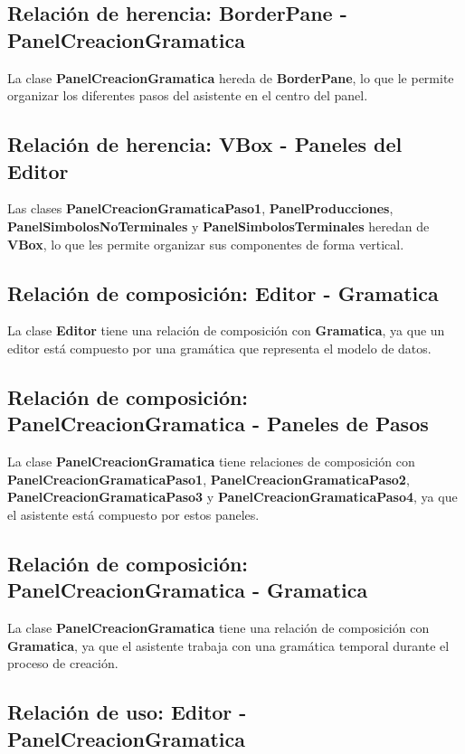 \subsection{Relación de herencia: BorderPane - PanelCreacionGramatica}

La clase \textbf{PanelCreacionGramatica} hereda de \textbf{BorderPane}, lo que le permite organizar los diferentes pasos del asistente en el centro del panel.

\subsection{Relación de herencia: VBox - Paneles del Editor}

Las clases \textbf{PanelCreacionGramaticaPaso1}, \textbf{PanelProducciones}, \textbf{PanelSimbolosNoTerminales} y \textbf{PanelSimbolosTerminales} heredan de \textbf{VBox}, lo que les permite organizar sus componentes de forma vertical.

\subsection{Relación de composición: Editor - Gramatica}

La clase \textbf{Editor} tiene una relación de composición con \textbf{Gramatica}, ya que un editor está compuesto por una gramática que representa el modelo de datos.

\subsection{Relación de composición: PanelCreacionGramatica - Paneles de Pasos}

La clase \textbf{PanelCreacionGramatica} tiene relaciones de composición con \textbf{PanelCreacionGramaticaPaso1}, \textbf{PanelCreacionGramaticaPaso2}, \textbf{PanelCreacionGramaticaPaso3} y \textbf{PanelCreacionGramaticaPaso4}, ya que el asistente está compuesto por estos paneles.

\subsection{Relación de composición: PanelCreacionGramatica - Gramatica}

La clase \textbf{PanelCreacionGramatica} tiene una relación de composición con \textbf{Gramatica}, ya que el asistente trabaja con una gramática temporal durante el proceso de creación.

\subsection{Relación de uso: Editor - PanelCreacionGramatica}


